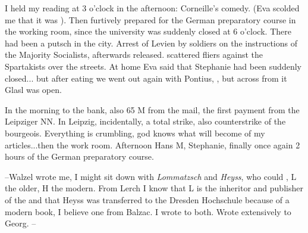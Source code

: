 
\missing I held my reading at 3 o'clock in the afternoon: Corneille's comedy. (Eva scolded me that it was ). Then furtively prepared for the German preparatory course in the working room, since the university was suddenly closed at 6 o'clock. There had been a putsch in the city. Arrest of Levien by soldiers on the instructions of the Majority Socialists, afterwards released.  scattered fliers against the Spartakists over the streets. At home Eva said that Stephanie had been suddenly closed... but after eating we went out again with Pontius, , but across from it Glasl was open. \missing

In the morning to the bank, also 65 M from the mail, the first payment from the Leipziger NN. In Leipzig, incidentally, a total strike, also counterstrike of the bourgeois. Everything is crumbling, god knows what will become of my articles...then the work room. Afternoon Hans M, Stephanie, finally once again 2 hours of the German preparatory course.

--Walzel wrote me, I might sit down with \textit{Lommatzsch} and \textit{Heyss}, who could , L the older, H the modern. From Lerch I know that L is the inheritor and publisher of the  and that Heyss was transferred to the Dresden Hochschule because of a modern book, I believe one from Balzac. I wrote to both. Wrote extensively to Georg. --